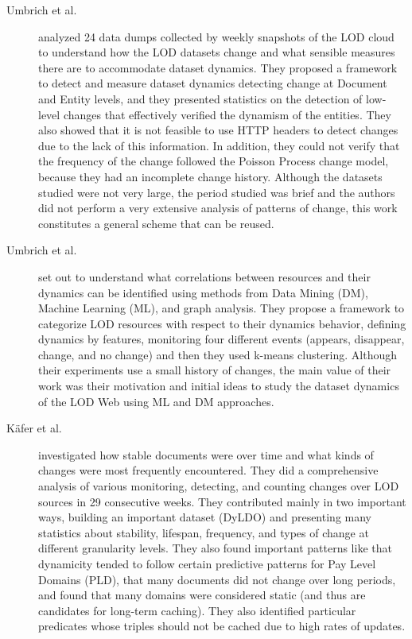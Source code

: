 \documentclass[sw]{iosart2x}
\begin{document}
	\begin{description}
	\item[Umbrich et al. \cite{UmbrichHHPD10}]  analyzed 24 data dumps collected by weekly snapshots of the LOD cloud to understand how the LOD datasets change and what sensible measures there are to accommodate dataset dynamics. They proposed a framework to detect and measure dataset dynamics detecting change at Document and Entity levels, and they presented statistics on the detection of low-level changes that effectively verified the dynamism of the entities. They also showed that it is not feasible to use HTTP headers to detect changes due to the lack of this information. In addition, they could not verify that the frequency of the change followed the Poisson Process change model, because they had an incomplete change history. Although the datasets studied were not very large, the period studied was brief and the authors did not perform a very extensive analysis of patterns of change, this work constitutes a general scheme that can be reused.
	
	\item[Umbrich et al. \cite{UmbrichKL10}] set out to understand what correlations between resources and their dynamics can be identified using methods from Data Mining (DM), Machine Learning (ML), and graph analysis. They propose a framework to categorize LOD resources with respect to their dynamics behavior, defining dynamics by features, monitoring four different events (appears, disappear, change, and no change) and then they used k-means clustering. Although their experiments use a small history of changes, the main value of their work was their motivation and initial ideas to study the dataset dynamics of the LOD Web using ML and DM approaches.
	
	\item[K{\"{a}}fer et al. \cite{KaferAUOH13}] investigated how stable documents were over time and what kinds of changes were most frequently encountered. They did a comprehensive analysis of various monitoring, detecting, and counting changes over LOD sources in 29 consecutive weeks. They contributed mainly in two important ways, building an important dataset (DyLDO) and presenting many statistics about stability, lifespan, frequency, and types of change at different granularity levels. They also found important patterns like that dynamicity tended to follow certain predictive patterns for Pay Level Domains (PLD), that many documents did not change over long periods, and found that many domains were considered static (and thus are candidates for long-term caching). They also identified particular predicates whose triples should not be cached due to high rates of updates.
	

\end{description}
\end{document}
